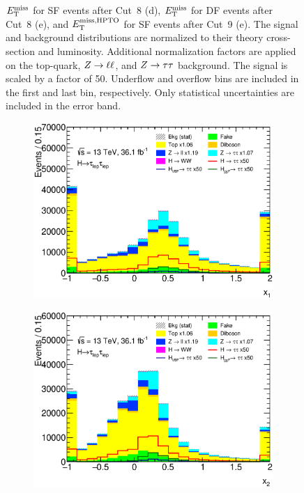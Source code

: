 \begin{figure}[htb]
{             $E_\text{T}^\text{miss}$ for SF events after Cut~8 (d), $E_\text{T}^\text{miss}$ for DF events after Cut~8 (e), and $E_\text{T}^\text{miss,HPTO}$ for SF events after Cut~9 (e).
             The signal and background distributions are normalized to their theory cross-section and luminosity.
             Additional normalization factors are applied on the top-quark, $Z \to \ell \ell$, and $Z \to \tau \tau$ background.
             The signal is scaled by a factor of 50.
             Underflow and overflow bins are included in the first and last bin, respectively.
             Only statistical uncertainties are included in the error band.}\label{fig:event_selection:cutflow:1}
\end{figure}

\begin{figure}[htb]
    \centering
    \begin{subfigure}[t]{0.45\textwidth}
        \includegraphics[width=\textwidth]{./plots/event_selection/presel/ll-CutHPTO-x0wide-lin.eps}
        \caption{}\label{fig:event_selection:cutflow:x1}
    \end{subfigure}
    \begin{subfigure}[t]{0.45\textwidth}
        \includegraphics[width=\textwidth]{./plots/event_selection/presel/ll-CutHPTO-x1wide-lin.eps}

\end{subfigure}
\end{figure}
